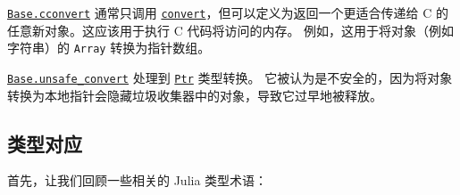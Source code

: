 \hyperlink{16487788729383051927}{\texttt{Base.cconvert}} 通常只调用 \hyperlink{1846942650946171605}{\texttt{convert}}，但可以定义为返回一个更适合传递给 C 的任意新对象。这应该用于执行 C 代码将访问的内存。 例如，这用于将对象（例如字符串）的 \texttt{Array} 转换为指针数组。



\hyperlink{6011318385865707029}{\texttt{Base.unsafe\_convert}} 处理到 \hyperlink{10630331440513004826}{\texttt{Ptr}} 类型转换。 它被认为是不安全的，因为将对象转换为本地指针会隐藏垃圾收集器中的对象，导致它过早地被释放。



\hypertarget{16132350195879344041}{}


\subsection{类型对应}



首先，让我们回顾一些相关的 Julia 类型术语：




